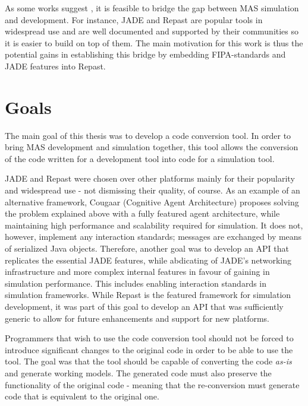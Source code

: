 As some works suggest \cite{gormer2011jrep,garcia2011misia,warden2010towards}, it is feasible to bridge the gap between MAS simulation and development. For instance, JADE and Repast are popular tools in widespread use and are well documented and supported by their communities so it is easier to build on top of them. The main motivation for this work is thus the potential gains in establishing this bridge by embedding FIPA-standards and JADE features into Repast.

\section{Goals}
The main goal of this thesis was to develop a code conversion tool. In order to bring MAS development and simulation together, this tool allows the conversion of the code written for a development tool into code for a simulation tool. 

JADE and Repast were chosen over other platforms mainly for their popularity and widespread use - not dismissing their quality, of course. As an example of an alternative framework, Cougaar (Cognitive Agent Architecture)\cite{helsinger2004cougaar} proposes solving the problem explained above with a fully featured agent architecture, while maintaining high performance and scalability required for simulation. It does not, however, implement any interaction standards; messages are exchanged by means of serialized Java objects. Therefore, another goal was to develop an API that replicates the essential JADE features, while abdicating of JADE's networking infrastructure and more complex internal features in favour of gaining in simulation performance. This includes enabling interaction standards in simulation frameworks. While Repast is the featured framework for simulation development, it was part of this goal to develop an API that was sufficiently generic to allow for future enhancements and support for new platforms.

Programmers that wish to use the code conversion tool should not be forced to introduce significant changes to the original code in order to be able to use the tool. The goal was that the tool should be capable of converting the code \emph{as-is} and generate working models. The generated code must also preserve the functionality of the original code - meaning that the re-conversion must generate code that is equivalent to the original one.

